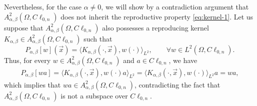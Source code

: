 \documentclass[12pt]{article}
\begin{document}
Nevertheless, for the case $\alpha\ne 0$, we will show by a contradiction argument that $A_{\alpha,\beta}^2(\Omega,C\ell_{0,n})$ does not inherit the reproductive property \eqref{eq:kernel-1}. Let us suppose that $A_{\alpha,\beta}^2(\Omega,C\ell_{0,n})$ also possesses a reproducing kernel $K_{\alpha,\beta}\in A_{\alpha,\beta}^2(\Omega,C\ell_{0,n})$ such that 
\begin{equation*}\label{eq:kernel-2}
   P_{\alpha,\beta}[w](\vec x)=\langle  K_{\alpha,\beta}(\cdot, \vec x), w(\cdot)\rangle_{L^2},\qquad \forall w\in L^2(\Omega,C\ell_{0,n}).
\end{equation*}
Thus, for every $w\in A_{\alpha,\beta}^2(\Omega,C\ell_{0,n})$ and $a\in C\ell_{0,n}$, we have
\begin{align*}
    P_{\alpha,\beta}[wa]=\langle  K_{\alpha,\beta}(\cdot, \vec x), w(\cdot)a\rangle_{L^2}=\langle  K_{\alpha,\beta}(\cdot, \vec x), w(\cdot)\rangle_{L^2}a=wa,
\end{align*}
which implies that $wa\in A_{\alpha,\beta}^2(\Omega,C\ell_{0,n})$, contradicting the fact that $A_{\alpha,\beta}^2(\Omega,C\ell_{0,n})$ is not a subspace over $C\ell_{0,n}$.

\end{document}
